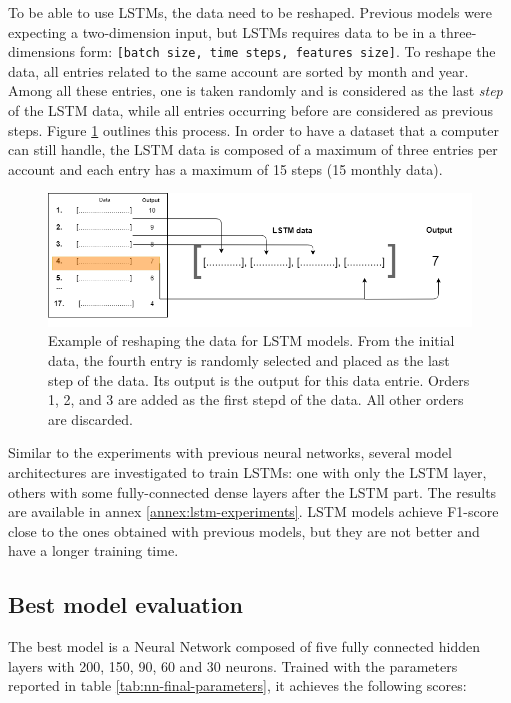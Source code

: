 To be able to use LSTMs, the data need to be reshaped. Previous models were expecting a two-dimension input, but LSTMs requires data to be in a three-dimensions form: \texttt{[batch size, time steps, features size]}. To reshape the data, all entries related to the same account are sorted by month and year. Among all these entries, one is taken randomly and is considered as the last \textit{step} of the LSTM data, while all entries occurring before are considered as previous steps. Figure \ref{fig:lst-data-build} outlines this process. In order to have a dataset that a computer can still handle, the LSTM data is composed of a maximum of three entries per account and each entry has a maximum of 15 steps (15 monthly data).

\begin{figure}[htbp]
    \centering
    \includegraphics[width=12cm]{images/lstm-data-build.png}
    \caption[Data combination for LSTM networks]{Example of reshaping the data for LSTM models. From the initial data, the fourth entry is randomly selected and placed as the last step of the data. Its output is the output for this data entrie. Orders 1, 2, and 3 are added as the first stepd of the data. All other orders are discarded.}
    \label{fig:lst-data-build}
\end{figure}

Similar to the experiments with previous neural networks, several model architectures are investigated to train LSTMs: one with only the LSTM layer, others with some fully-connected dense layers after the LSTM part. The results are available in annex \ref{annex:lstm-experiments}. LSTM models achieve F1-score close to the ones obtained with previous models, but they are not better and have a longer training time.



\subsection{Best model evaluation}
\label{sec:best-model}

The best model is a Neural Network composed of five fully connected hidden layers with 200, 150, 90, 60 and 30 neurons. Trained with the parameters reported in table \ref{tab:nn-final-parameters}, it achieves the following scores:

